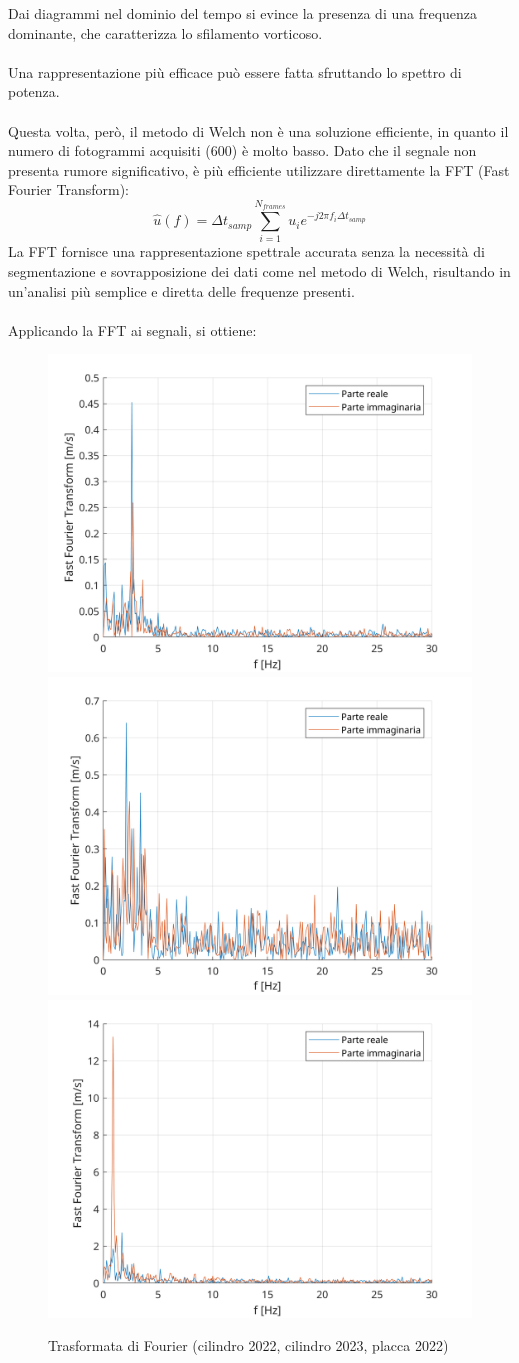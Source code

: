 \noindent Dai diagrammi nel dominio del tempo si evince la presenza di una frequenza dominante, che caratterizza lo sfilamento vorticoso.\\\\
Una rappresentazione più efficace può essere fatta sfruttando lo spettro di potenza.\\\\
Questa volta, però, il metodo di Welch non è una soluzione efficiente, in quanto il numero di fotogrammi acquisiti (600) è molto basso. Dato che il segnale non presenta rumore significativo, è più efficiente utilizzare direttamente la FFT (Fast Fourier Transform):
\begin{equation*}
    \hat u(f) = \Delta t_{samp} \sum_{i=1}^{N_{frames}} u_i e^{-j2\pi f_i \Delta t_{samp}}
\end{equation*}
La FFT fornisce una rappresentazione spettrale accurata senza la necessità di segmentazione e sovrapposizione dei dati come nel metodo di Welch, risultando in un'analisi più semplice e diretta delle frequenze presenti.\\\\
Applicando la FFT ai segnali, si ottiene:
\begin{figure}[H]
    \centering
    \includegraphics[width=.6\textwidth]{images/11/FFT22.png}
    \includegraphics[width=.49\textwidth]{images/11/FFT23.png}
    \includegraphics[width=.49\textwidth]{images/11/FFT220.png}
    \caption{Trasformata di Fourier (cilindro 2022, cilindro 2023, placca 2022)}
\end{figure}

